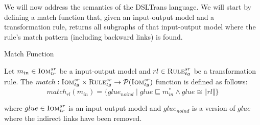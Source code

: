 We will now address the semantics of the DSLTrans language. We will start by defining a match function that, given an input-output model and a transformation rule, returns all subgraphs of that input-output model where the rule's match pattern (including backward links) is found.  


\begin{definition}{Match Function}
\label{def:match_function}

Let $m_{in}\in \textsc{Iom}^{sr}_{tr}$ be a input-output model and $rl\in \textsc{Rule}^{sr}_{tg}$ be a transformation
rule. The $match : \textsc{Iom}^{sr}_{tg}\times \textsc{Rule}^{sr}_{tg}\rightarrow
\mathcal{P}(\textsc{Iom}^{sr}_{tg})$ function is defined as follows: $$match_{rl}(m_{in})= \big\{ glue_{noind}\;|\;
glue\sqsubseteq m_{in}^{*} \land glue \cong \Vert rl\Vert\big\}$$

where $glue\in \textsc{Iom}^{sr}_{tr}$ is an input-output model and $glue_{noind}$ is a version of $glue$ where the indirect links have been removed.
% 



\end{definition}
